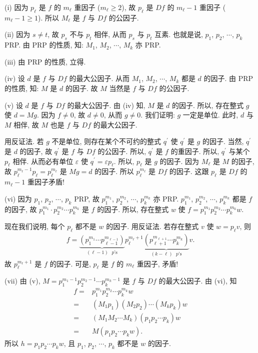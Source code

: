 \begin{pf}
    (i) 因为 $p_\ell$ 是 $f$ 的 $m_\ell$ 重因子 ($m_\ell \geq 2$), 故 $p_\ell$ 是 $Df$ 的 $m_\ell - 1$ 重因子 ($m_\ell - 1 \geq 1$). 所以 $M_\ell$ 是 $f$ 与 $Df$ 的公因子.

    (ii) 因为 $s \neq t$, 故 $p_s$ 不与 $p_t$ 相伴, 从而 $p_s$ 与 $p_t$ 互素. 也就是说, $p_1$, $p_2$, $\cdots$, $p_k$ PRP. 由 PRP 的性质, 知: $M_1$, $M_2$, $\cdots$, $M_k$ 亦 PRP.

    (iii) 由 PRP 的性质, 立得.

    (iv) 设 $d$ 是 $f$ 与 $Df$ 的最大公因子. 从而 $M_1$, $M_2$, $\cdots$, $M_k$ 都是 $d$ 的因子. 由 PRP 的性质, 知: $M$ 是 $d$ 的因子. 故 $M$ 当然是 $f$ 与 $Df$ 的公因子.

    (v) 设 $d$ 是 $f$ 与 $Df$ 的最大公因子. 由 (iv) 知, $M$ 是 $d$ 的因子. 所以, 存在整式 $g$ 使 $d = Mg$. 因为 $f \neq 0$, 故 $d \neq 0$, 从而 $g \neq 0$. 我们证明: $g$ 一定是单位. 此时, $d$ 与 $M$ 相伴, 故 $M$ 也是 $f$ 与 $Df$ 的最大公因子.

    用反证法. 若 $g$ 不是单位, 则存在某个不可约的整式 $q^{\prime}$ 使 $q^{\prime}$ 是 $g$ 的因子. 当然, $q^{\prime}$ 是 $d$ 的因子, 故 $q^{\prime}$ 是 $f$ 与 $Df$ 的公因子. 所以, $q^{\prime}$ 是 $f$ 的重因子. 所以, $q^{\prime}$ 与某个 $p_{\ell}$ 相伴. 从而必有单位 $\varepsilon$ 使 $q^{\prime} = \varepsilon p_{\ell}$. 所以, $p_{\ell}$ 是 $g$ 的因子. 因为 $M_\ell$ 是 $M$ 的因子, 故 $p_{\ell}^{m_\ell - 1} p_{\ell} = p_{\ell}^{m_\ell}$ 是 $Mg = d$ 的因子. 所以 $p_{\ell}^{m_\ell}$ 是 $Df$ 的因子. 这跟 $p_\ell$ 是 $Df$ 的 $m_\ell - 1$ 重因子矛盾!

    (vi) 因为 $p_1$, $p_2$, $\cdots$, $p_k$ PRP, 故 $p_1^{m_1}$, $p_2^{m_2}$, $\cdots$, $p_k^{m_k}$ 亦 PRP. $p_1^{m_1}$, $p_2^{m_2}$, $\cdots$, $p_k^{m_k}$ 都是 $f$ 的因子, 故 $p_1^{m_1} \cdot p_2^{m_2} \cdots p_k^{m_k}$ 是 $f$ 的因子. 所以, 存在整式 $w$ 使 $f = p_1^{m_1} p_2^{m_2} \cdots p_k^{m_k} w$.

    现在我们说明, 每个 $p_\ell$ 都不是 $w$ 的因子. 用反证法. 若存在整式 $v$ 使 $w = p_\ell v$, 则
    \begin{align*}
        f = \underbrace{(p_1^{m_1} \cdots p_{\ell-1}^{m_{\ell-1}})}_{\text{$(\ell - 1)$ $p$'s}} p_{\ell}^{m_\ell + 1} \underbrace{(p_{\ell+1}^{m_{\ell + 1}} \cdots p_k^{m_k})}_{\text{$(k-\ell)$ $p$'s}} v.
    \end{align*}
    故 $p_{\ell}^{m_\ell + 1}$ 是 $f$ 的因子. 可是, $p_\ell$ 是 $f$ 的 $m_\ell$ 重因子, 矛盾!

    (vii) 由 (v), $M = p_1^{m_1 - 1} p_2^{m_2 - 1} \cdots p_k^{m_k - 1}$ 是 $f$ 与 $Df$ 的最大公因子. 由 (vi), 知
    \begin{align*}
        f
        = {} & p_1^{m_1} p_2^{m_2} \cdots p_k^{m_k} w      \\
        = {} & (M_1 p_1) (M_2 p_2) \cdots (M_k p_k) w      \\
        = {} & (M_1 M_2 \cdots M_k) (p_1 p_2 \cdots p_k) w \\
        = {} & M (p_1 p_2 \cdots p_k w).
    \end{align*}
    所以 $h = p_1 p_2 \cdots p_k w$, 且 $p_1$, $p_2$, $\cdots$, $p_k$ 都不是 $w$ 的因子.


\end{pf}
